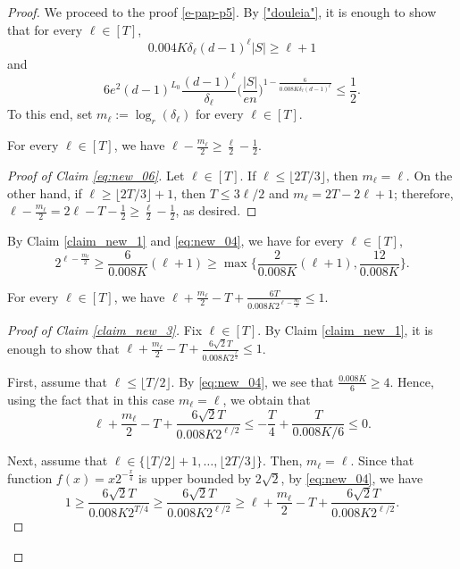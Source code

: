 \documentclass[10pt,a4paper]{amsart}
\begin{document}
\begin{proof}
We proceed to the proof \eqref{e-pap-p5}. By \eqref{"douleia"}, it is enough to show that for every $\ell\in[T]$,
\begin{equation} \label{eq:new_05}
0.004 K \delta_\ell (d-1)^\ell |S|\geqslant \ell+1
\end{equation}
and
\begin{equation} \label{eq:new_06}
6e^2(d-1)^{L_0}\frac{(d-1)^\ell}{\delta_\ell} \Big(\frac{|S|}{en}\Big)^{1-\frac{6}{0.008 K \delta_\ell (d-1)^\ell}}
\leqslant\frac{1}{2}.
\end{equation}
To this end, set $m_\ell:= \log_{r}(\delta_\ell)$ for every $\ell\in[T]$.
\begin{claim}\label{claim_new_1}
 For every $\ell\in[T]$, we have $\ell - \frac{m_\ell}{2}\geqslant \frac{\ell}{2}-\frac{1}{2}$.
\end{claim}
\begin{proof}[Proof of Claim \ref{eq:new_06}]
Let $\ell\in[T]$. If $\ell\leqslant\lfloor 2T/3\rfloor$, then $m_\ell = \ell$. On the other hand,
if $\ell \geqslant \lfloor 2T/3\rfloor+1$, then $T\leqslant 3\ell/2$ and $m_\ell = 2T -2\ell +1$;
therefore, $\ell - \frac{m_\ell}{2} = 2\ell-T-\frac{1}{2}\geqslant \frac{\ell}{2}-\frac{1}{2}$, as desired.
\end{proof}
By Claim \ref{claim_new_1} and  \eqref{eq:new_04}, we have for every $\ell\in [T]$,
\begin{equation} \label{"douleia2"}
2^{\ell - \frac{m_\ell}{2}}\geqslant \frac{6}{0.008 K}(\ell+1)
\geqslant \max\Big\{ \frac{2}{0.008 K}(\ell+1), \frac{12}{0.008 K}\Big\}.
\end{equation}
\begin{claim}\label{claim_new_3}
For every $\ell\in[T]$, we have $\ell + \frac{m_\ell}{2} - T +\frac{6T}{0.008 K 2^{\ell-\frac{m_\ell}{2}}}\leqslant1$.
\end{claim}
\begin{proof}[Proof of Claim \ref{claim_new_3}]
Fix $\ell\in[T]$. By Claim \ref{claim_new_1}, it is enough to show that $\ell + \frac{m_\ell}{2} - T +\frac{6\sqrt{2}T}{0.008 K 2^{\frac{\ell}{2}}}\leqslant1$.

First, assume that $\ell \leqslant \lfloor T/2 \rfloor$. By \eqref{eq:new_04}, we see that $\frac{0.008K}{6}\geqslant 4$. Hence, using the fact that in this case $m_\ell=\ell$, we obtain that
\[ \ell + \frac{m_\ell}{2} - T +\frac{6\sqrt{2}T}{0.008 K 2^{\ell/2}}\leqslant-\frac{T}{4} + \frac{T}{0.008 K/6 }\leqslant0.\]

Next, assume that $\ell\in\{\lfloor T/2\rfloor+1,\dots,\lfloor2T/3\rfloor\}$. Then, $m_\ell = \ell$.
Since that function $f(x)=x2^{-\frac{x}{4}}$ is upper bounded by $2\sqrt{2}$, by \eqref{eq:new_04}, we have
\[ 1\geqslant \frac{6\sqrt{2}T}{0.008 K 2^{T/4}} \geqslant \frac{6\sqrt{2}T}{0.008 K 2^{\ell/2}}
\geqslant \ell +\frac{m_\ell}{2} -T + \frac{6\sqrt{2}T}{0.008 K 2^{\ell/2}}. \]


\end{proof}
\end{proof}
\end{document}
